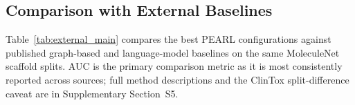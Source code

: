 \documentclass[pdflatex,sn-mathphys-num]{sn-jnl}%
\theoremstyle{thmstyleone}%
\theoremstyle{thmstyletwo}%
\theoremstyle{thmstylethree}%
\begin{document}
\begin{table}[!ht]
\centering
\caption{Selected LoRA configurations illustrating the range of parameter efficiency. Trainable~\% = 100 $\times$ trainable / total parameters.}
\label{tab:params}
\end{table}

\subsection{Comparison with External Baselines}\label{sec:external_comparison}
Table~\ref{tab:external_main} compares the best PEARL configurations against published
graph-based and language-model baselines on the same MoleculeNet scaffold splits.
AUC is the primary comparison metric as it is most consistently reported across sources;
full method descriptions and the ClinTox split-difference caveat are in Supplementary Section~S5.
\end{document}
